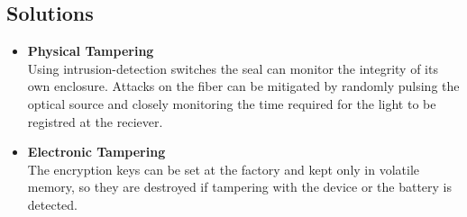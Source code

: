 \documentclass[12pt,twoside,a4paper]{scrartcl}
\begin{document}
    \subsection{Solutions}
    \begin{center}
        \begin{itemize}
            \item \textbf{Physical Tampering}\\
                Using intrusion-detection switches the seal can monitor the integrity of its own enclosure. Attacks on the fiber can be mitigated by randomly pulsing the optical source and closely monitoring the time required for the light to be registred at the reciever.
                
            \item \textbf{Electronic Tampering}\\
                The encryption keys can be set at the factory and kept only in volatile memory, so they are destroyed if tampering with the device or the battery is detected.
                
                
        \end{itemize}
        
    \end{center}
\end{document}
